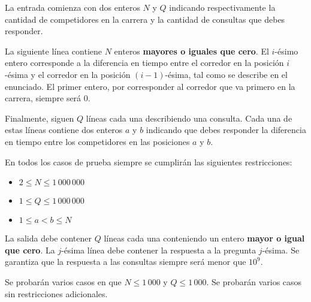 \documentclass{oci}
\begin{document}
\begin{inputDescription}
  La entrada comienza con dos enteros $N$ y $Q$ indicando respectivamente la cantidad de
  competidores en la carrera y la cantidad de consultas que debes responder.

  La siguiente línea contiene $N$ enteros \textbf{mayores o iguales que cero}.
  El $i$-ésimo entero corresponde a la diferencia en tiempo entre el corredor en la posición
  $i$-ésima y el corredor en la posición $(i-1)$-ésima, tal como se describe en el enunciado.
  El primer entero, por corresponder al corredor que va primero en la carrera, siempre será 0.
  
  Finalmente, siguen $Q$ líneas cada una describiendo una consulta.
  Cada una de estas líneas contiene dos enteros $a$ y $b$ indicando que debes
  responder la diferencia en tiempo entre los competidores en las posiciones $a$ y $b$.

  En todos los casos de prueba siempre se cumplirán las siguientes restricciones:
  \begin{itemize}
  \item $2 \leq N \leq 1\,000\,000$
  \item $1 \leq Q \leq 1\,000\,000$
  \item $1 \leq a < b \leq N$
  \end{itemize}
\end{inputDescription}

\begin{outputDescription}
  La salida debe contener $Q$ líneas cada una conteniendo un entero \textbf{mayor o igual que cero}.
  La $j$-ésima línea debe contener la respuesta a la pregunta $j$-ésima.
  Se garantiza que la respuesta a las consultas siempre será menor que $10^9$.
\end{outputDescription}

\begin{scoreDescription}
  Se probarán varios casos en que $N \leq 1\,000$ y $Q \leq 1\,000$.
  Se probarán varios casos sin restricciones adicionales.
\end{scoreDescription}

\begin{sampleDescription}
\end{sampleDescription}
\end{document}
